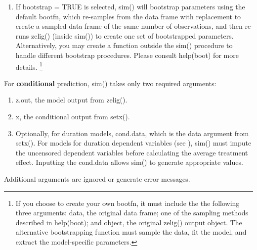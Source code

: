 \documentclass[letterpaper,10pt,english]{sphinxmanual}
\begin{document}
\begin{enumerate}
\begin{enumerate}
\item {} 
If bootstrap = TRUE is selected, sim() will bootstrap parameters
using the default bootfn, which re-samples from the data frame
with replacement to create a sampled data frame of the same number
of observations, and then re-runs zelig() (inside sim()) to create
one set of bootstrapped parameters. Alternatively, you may create
a function outside the sim() procedure to handle different
bootstrap procedures. Please consult help(boot) for more
details. \footnote{
If you choose to create your own bootfn, it must include the the
following three arguments: data, the original data frame; one of the
sampling methods described in help(boot); and object, the original
zelig() output object. The alternative bootstrapping function must
sample the data, fit the model, and extract the model-specific
parameters.
}

\end{enumerate}

For \textbf{conditional} prediction, sim() takes only two required
arguments:
\begin{enumerate}
\item {} 
z.out, the model output from zelig().

\item {} 
x, the conditional output from setx().

\item {} 
Optionally, for duration models, cond.data, which is the data
argument from setx(). For models for duration dependent variables
(see ), sim() must impute the uncensored dependent variables
before calculating the average treatment effect. Inputting the
cond.data allows sim() to generate appropriate values.

\end{enumerate}

Additional arguments are ignored or generate error messages.

\end{enumerate}
\end{document}
